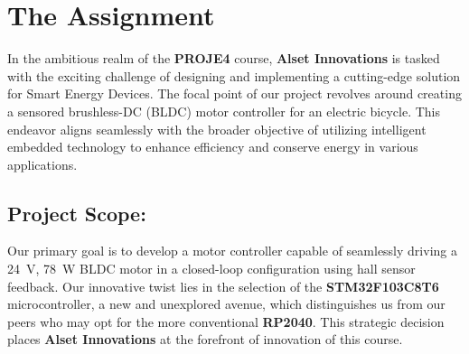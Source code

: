 \section{The Assignment}
In the ambitious realm of the \textbf{PROJE4} course, \textbf{Alset Innovations} is tasked with the exciting challenge of designing and implementing a cutting-edge solution for Smart Energy Devices. The focal point of our project revolves around creating a sensored brushless-DC (BLDC) motor controller for an electric bicycle. This endeavor aligns seamlessly with the broader objective of utilizing intelligent embedded technology to enhance efficiency and conserve energy in various applications.

\subsection{Project Scope:}
Our primary goal is to develop a motor controller capable of seamlessly driving a \SI{24}{\volt}, \SI{78}{\watt} BLDC motor in a closed-loop configuration using hall sensor feedback. Our innovative twist lies in the selection of the \textbf{STM32F103C8T6} microcontroller, a new and unexplored avenue, which distinguishes us from our peers who may opt for the more conventional \textbf{RP2040}. This strategic decision places \textbf{Alset Innovations} at the forefront of innovation of this course.


